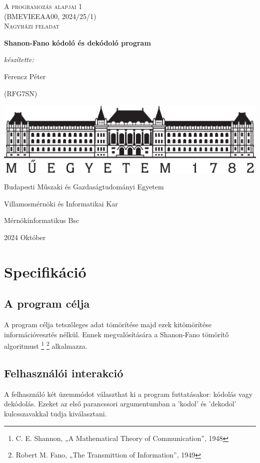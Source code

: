 \documentclass[12pt,a4paper]{report}
\begin{document}
\begin{titlepage}
    \centering
    \vspace{1cm}
    {\Large \textsc{A programozás alapjai 1\\(BMEVIEEAA00, 2024/25/1)\\  Nagyházi feladat}\par}
    \vspace{1.5cm}  
    {\huge\bfseries Shanon-Fano kódoló és dekódoló program\par}
    \vspace{2cm}
    {\Large\itshape készítette: \par Ferencz Péter\par (RFG7SN)}
    \vfill
    \includegraphics[totalheight=3cm]{BMEKicsi.png}\par
    Budapesti Műszaki és Gazdaságtudományi Egyetem\par
    Villamosmérnöki és Informatikai Kar\par
    Mérnökinformatikus Bsc\par
    {\large 2024 Október\par}
\end{titlepage}

\tableofcontents
\newpage

\chapter{Specifikáció}

\section{A program célja}
A program célja tetszőleges adat tömörítése majd ezek kitömörítése információvesztés nélkül.
Ennek megvalósítására a Shanon-Fano tömörítő algoritmust
\footnote{C. E. Shannon, „A Mathematical Theory of Communication”, 1948}
\footnote{Robert M. Fano, „The Transmittion of Information”, 1949}
alkalmazza.

\section{Felhasználói interakció}
A felhasználó két üzemmódot választhat ki a program futtatásakor: kódolás vagy dekódolás. Ezeket az első parancssori argumentumban a 
'kodol' és 'dekodol' kulcsszavakkal tudja kiválasztani.
\end{document}
